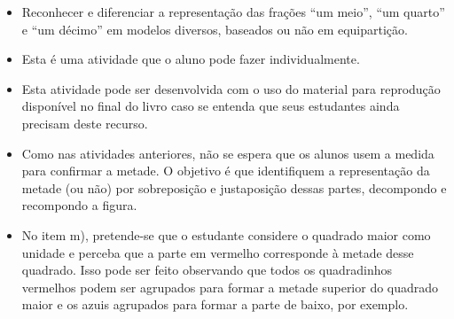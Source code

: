 \begin{atividade}\label{chap1-ativ13}
\objetivos
\begin{itemize} %
    \item Reconhecer e diferenciar a representação das frações ``um meio'', ``um quarto'' e       ``um décimo'' em modelos diversos, baseados  ou não em equipartição.
\end{itemize} %

\discussoes
\begin{itemize} %
\item       Esta é uma atividade que o aluno pode fazer individualmente.
\item Esta atividade pode ser desenvolvida com o uso do material para reprodução disponível no final do livro caso se entenda que seus estudantes ainda precisam deste recurso.
\item Como nas atividades anteriores, não se espera que os alunos usem a medida para confirmar a metade. O objetivo é que identifiquem a representação da metade (ou não) por sobreposição e justaposição dessas partes, decompondo e recompondo a figura.
\item No item m), pretende-se que o estudante considere o quadrado maior como unidade e perceba que a parte em vermelho corresponde à metade desse quadrado. Isso pode ser feito observando que todos os quadradinhos vermelhos podem ser agrupados para formar a metade superior do quadrado maior e os azuis agrupados para formar a parte de baixo, por exemplo.
\begin{center}
\quad
{}
\end{center}


\end{itemize}
\end{atividade}
